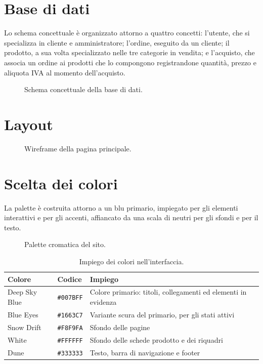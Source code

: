 \documentclass[11pt,a4paper]{article}
\begin{document}
\section{Base di dati}

Lo schema concettuale è organizzato attorno a quattro concetti: l'utente, che si
specializza in cliente e amministratore; l'ordine, eseguito da un cliente; il
prodotto, a sua volta specializzato nelle tre categorie in vendita; e l'acquisto,
che associa un ordine ai prodotti che lo compongono registrandone quantità,
prezzo e aliquota IVA al momento dell'acquisto.

\begin{figure}[H]
  \centering
  \schemaER
  \caption{Schema concettuale della base di dati.}\label{fig:er}
\end{figure}

\section{Layout}

\begin{figure}[H]
  \centering
  \resizebox{0.78\linewidth}{!}{\wireframeHome}
  \caption{Wireframe della pagina principale.}\label{fig:layout}
\end{figure}

\section{Scelta dei colori}

La palette è costruita attorno a un blu primario, impiegato per gli elementi
interattivi e per gli accenti, affiancato da una scala di neutri per gli sfondi e
per il testo.

\begin{figure}[H]
  \centering
  \paletteColori
  \caption{Palette cromatica del sito.}\label{fig:colori}
\end{figure}

\begin{table}[H]
  \centering
  \small
  \begin{tabular}{llp{7cm}}
    \toprule
    \textbf{Colore} & \textbf{Codice} & \textbf{Impiego} \\
    \midrule
    Deep Sky Blue & \texttt{\#007BFF} & Colore primario: titoli, collegamenti ed elementi in evidenza \\
    Blue Eyes     & \texttt{\#1663C7} & Variante scura del primario, per gli stati attivi \\
    Snow Drift    & \texttt{\#F8F9FA} & Sfondo delle pagine \\
    White         & \texttt{\#FFFFFF} & Sfondo delle schede prodotto e dei riquadri \\
    Dune          & \texttt{\#333333} & Testo, barra di navigazione e footer \\
    \bottomrule
  \end{tabular}
  \caption{Impiego dei colori nell'interfaccia.}\label{tab:colori}
\end{table}
\end{document}
